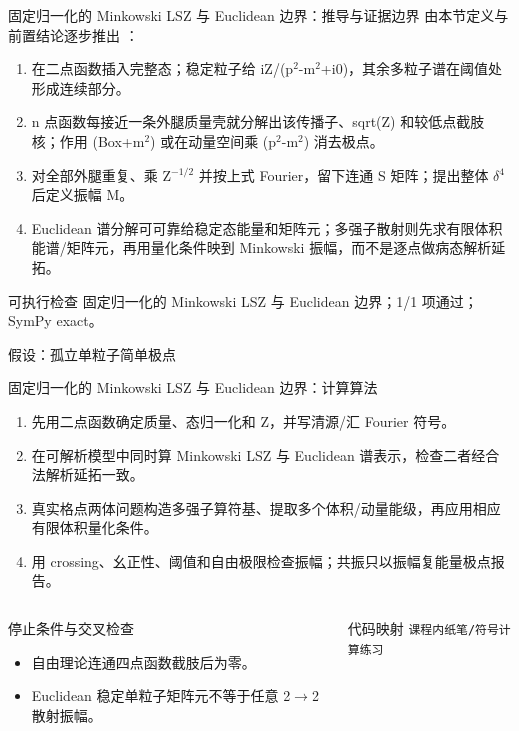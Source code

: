 \begin{frame}[t]{固定归一化的 Minkowski LSZ 与 Euclidean 边界：推导与证据边界}
\footnotesize
{}\quad 由本节定义与前置结论逐步推出 ：
\begin{enumerate}
\item 在二点函数插入完整态；稳定粒子给 iZ/\allowbreak{}(p\ensuremath{^{2}}-m\ensuremath{^{2}}+i0)，其余多粒子谱在阈值处形成连续部分。
\item n 点函数每接近一条外腿质量壳就分解出该传播子、sqrt(Z) 和较低点截肢核；作用 (Box+m\ensuremath{^{2}}) 或在动量空间乘 (p\ensuremath{^{2}}-m\ensuremath{^{2}}) 消去极点。
\item 对全部外腿重复、乘 Z\ensuremath{^{-1/2}} 并按上式 Fourier，留下连通 S 矩阵；提出整体 \ensuremath{\delta}\ensuremath{^{4}} 后定义振幅 M。
\item Euclidean 谱分解可可靠给稳定态能量和矩阵元；多强子散射则先求有限体积能谱/\allowbreak{}矩阵元，再用量化条件映到 Minkowski 振幅，而不是逐点做病态解析延拓。
\end{enumerate}\begin{block}{可执行检查}
\quad 固定归一化的 Minkowski LSZ 与 Euclidean 边界；1/1 项通过；SymPy exact。
\par\scriptsize 假设：孤立单粒子简单极点
\end{block}
\end{frame}

\begin{frame}[t]{固定归一化的 Minkowski LSZ 与 Euclidean 边界：计算算法}
\footnotesize
{}\begin{enumerate}
\item 先用二点函数确定质量、态归一化和 Z，并写清源/\allowbreak{}汇 Fourier 符号。
\item 在可解析模型中同时算 Minkowski LSZ 与 Euclidean 谱表示，检查二者经合法解析延拓一致。
\item 真实格点两体问题构造多强子算符基、提取多个体积/\allowbreak{}动量能级，再应用相应有限体积量化条件。
\item 用 crossing、幺正性、阈值和自由极限检查振幅；共振只以振幅复能量极点报告。
\end{enumerate}\begin{columns}[T,onlytextwidth]
\begin{block}{停止条件与交叉检查}\scriptsize\begin{itemize}
\item[\CheckMark] 自由理论连通四点函数截肢后为零。
\item[\CheckMark] Euclidean 稳定单粒子矩阵元不等于任意 2\ensuremath{\rightarrow}2 散射振幅。
\end{itemize}\end{block}
\begin{block}{代码映射}
\scriptsize \texttt{课程内纸笔/\allowbreak{}符号计算练习}
\end{block}\end{columns}\end{frame}

